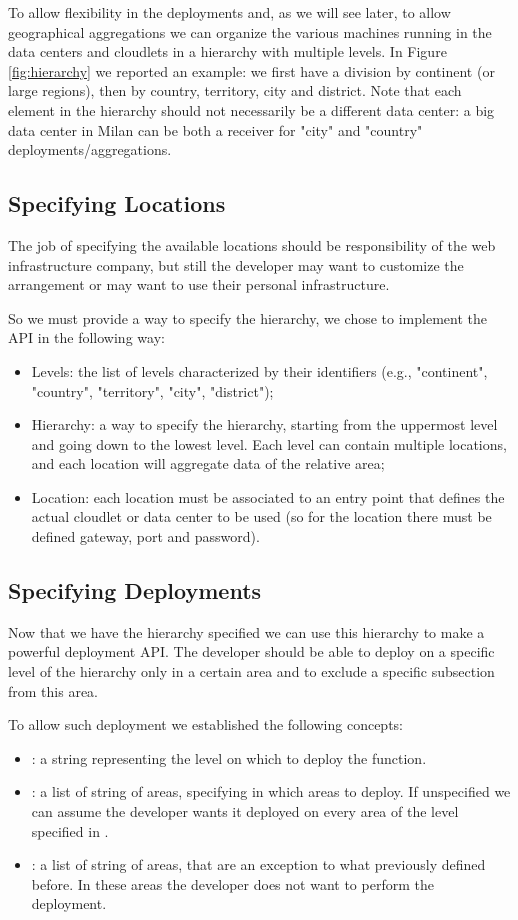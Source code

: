To allow flexibility in the deployments and, as we will see later, to allow geographical aggregations we can organize the various machines running in the data centers and cloudlets in a hierarchy with multiple levels.
In Figure \ref{fig:hierarchy} we reported an example: we first have a division by continent (or large regions), then by country, territory, city and district.
Note that each element in the hierarchy should not necessarily be a different data center: a big data center in Milan can be both a receiver for "city" and "country" deployments/aggregations.
\vspace{0.5cm}


\subsection{Specifying Locations}
The job of specifying the available locations should be responsibility of the web infrastructure company, but still the developer may want to customize the arrangement or may want to use their personal infrastructure. 

So we must provide a way to specify the hierarchy, we chose to implement the API in the following way:
\begin{itemize}
    \item Levels: the list of levels characterized by their identifiers (e.g., "continent", "country", "territory", "city", "district");
    \item Hierarchy: a way to specify the hierarchy, starting from the uppermost level and going down to the lowest level. Each level can contain multiple locations, and each location will aggregate data of the relative area;
    \item Location: each location must be associated to an entry point that defines the actual cloudlet or data center to be used (so for the location there must be defined gateway, port and password).
\end{itemize}


\subsection{Specifying Deployments}
Now that we have the hierarchy specified we can use this hierarchy to make a powerful deployment API. The developer should be able to deploy on a specific level of the hierarchy only in a certain area and to exclude a specific subsection from this area.

To allow such deployment we established the following concepts:
\begin{itemize}
    \item {}: a string representing the level on which to deploy the function.
    \item {}: a list of string of areas, specifying in which areas to deploy. If unspecified we can assume the developer wants it deployed on every area of the level specified in . 
     \item {}: a list of string of areas, that are an exception to what previously defined before. In these areas the developer does not want to perform the deployment.
\end{itemize}

